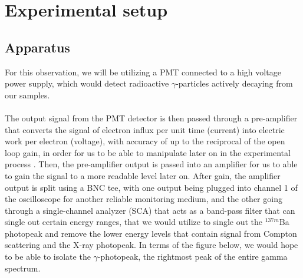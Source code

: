 \documentclass[10pt,letterpaper,onecolumn]{article}
\begin{document}

\section{Experimental setup}


\subsection{Apparatus}

For this observation, we will be utilizing a PMT connected to a high voltage power supply, which would detect radioactive $\gamma$-particles actively decaying from our samples. \\
\\
The output signal from the PMT detector is then passed through a pre-amplifier that converts the signal of electron influx per unit time (current) into electric work per electron (voltage), with accuracy of up to the reciprocal of the open loop gain, in order for us to be able to manipulate later on in the experimental process \cite{preamp}. Then, the pre-amplifier output is passed into an amplifier for us to able to gain the signal to a more readable level later on. After gain, the amplifier output is split using a BNC tee, with one output being plugged into channel 1 of the oscilloscope for another reliable monitoring medium, and the other going through a single-channel analyzer (SCA) that acts as a band-pass filter that can single out certain energy ranges, that we would utilize to single out the $^{137m}$Ba photopeak and remove the lower energy levels that contain signal from Compton scattering and the X-ray photopeak. In terms of the figure below, we would hope to be able to isolate the $\gamma$-photopeak, the rightmost peak of the entire gamma spectrum. \\
\end{document}
